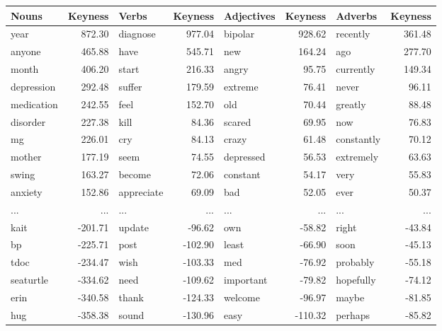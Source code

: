 \begin{table}
\centering
\footnotesize
\begin{tabular}{lr|lr|lr|lr}

\toprule
Nouns & Keyness & Verbs & Keyness & Adjectives &  Keyness & Adverbs & Keyness \\
\midrule
year       &   872.30 &  diagnose   &   977.04 &  bipolar   &   928.62 &  recently   &   361.48 \\
anyone     &   465.88 &  have       &   545.71 &  new       &   164.24 &  ago        &   277.70 \\
month      &   406.20 &  start      &   216.33 &  angry     &    95.75 &  currently  &   149.34 \\
depression &   292.48 &  suffer     &   179.59 &  extreme   &    76.41 &  never      &    96.11 \\
medication &   242.55 &  feel       &   152.70 &  old       &    70.44 &  greatly    &    88.48 \\
disorder   &   227.38 &  kill       &    84.36 &  scared    &    69.95 &  now        &    76.83 \\
mg         &   226.01 &  cry        &    84.13 &  crazy     &    61.48 &  constantly &    70.12 \\
mother     &   177.19 &  seem       &    74.55 &  depressed &    56.53 &  extremely  &    63.63 \\
swing      &   163.27 &  become     &    72.06 &  constant  &    54.17 &  very       &    55.83 \\
anxiety    &   152.86 &  appreciate &    69.09 &  bad       &    52.05 &  ever       &    50.37 \\
...        &      ... &  ...        &      ... &  ...       &      ... &   ...       &      ... \\
kait       &  -201.71 &  update     &   -96.62 &  own       &   -58.82 &  right      &   -43.84 \\
bp         &  -225.71 &  post       &  -102.90 &  least     &   -66.90 &  soon       &   -45.13 \\
tdoc       &  -234.47 &  wish       &  -103.33 &  med       &   -76.92 &  probably   &   -55.18 \\
seaturtle  &  -334.62 &  need       &  -109.62 &  important &   -79.82 &  hopefully  &   -74.12 \\
erin       &  -340.58 &  thank      &  -124.33 &  welcome   &   -96.97 &  maybe      &   -81.85 \\
hug        &  -358.38 &  sound      &  -130.96 &  easy      &  -110.32 &  perhaps    &   -85.82 \\

\end{tabular}
\end{table}
